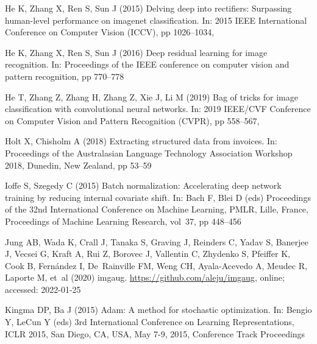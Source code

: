 \documentclass[twocolumn]{svjour3}
\begin{document}
\begin{thebibliography}{43}
	He K, Zhang X, Ren S, Sun J (2015) Delving deep into rectifiers: Surpassing
	human-level performance on imagenet classification. In: 2015 IEEE
	International Conference on Computer Vision (ICCV), pp 1026--1034,
	
	He K, Zhang X, Ren S, Sun J (2016) Deep residual learning for image
	recognition. In: Proceedings of the IEEE conference on computer vision and
	pattern recognition, pp 770--778
	
	He T, Zhang Z, Zhang H, Zhang Z, Xie J, Li M (2019) Bag of tricks for image
	classification with convolutional neural networks. In: 2019 IEEE/CVF
	Conference on Computer Vision and Pattern Recognition (CVPR), pp 558--567,
	
	Holt X, Chisholm A (2018) Extracting structured data from invoices. In:
	Proceedings of the Australasian Language Technology Association Workshop
	2018, Dunedin, New Zealand, pp 53--59
	
	Ioffe S, Szegedy C (2015) Batch normalization: Accelerating deep network
	training by reducing internal covariate shift. In: Bach F, Blei D (eds)
	Proceedings of the 32nd International Conference on Machine Learning, PMLR,
	Lille, France, Proceedings of Machine Learning Research, vol~37, pp 448--456
	
	Jung AB, Wada K, Crall J, Tanaka S, Graving J, Reinders C, Yadav S, Banerjee J,
	Vecsei G, Kraft A, Rui Z, Borovec J, Vallentin C, Zhydenko S, Pfeiffer K,
	Cook B, Fernández I, De~Rainville FM, Weng CH, Ayala-Acevedo A, Meudec R,
	Laporte M, et~al (2020) {imgaug}. \url{https://github.com/aleju/imgaug},
	online; accessed: 2022-01-25
	
	Kingma DP, Ba J (2015) Adam: {A} method for stochastic optimization. In: Bengio
	Y, LeCun Y (eds) 3rd International Conference on Learning Representations,
	{ICLR} 2015, San Diego, CA, USA, May 7-9, 2015, Conference Track Proceedings
	

\end{thebibliography}
\end{document}
